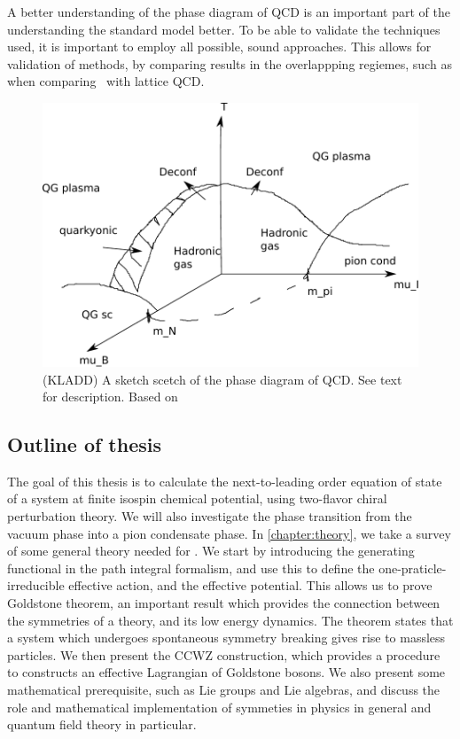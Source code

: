 A better understanding of the phase diagram of QCD is an important part of the understanding the standard model better.
To be able to validate the techniques used, it is important to employ all possible, sound approaches.
This allows for validation of methods, by comparing results in the overlappping regiemes, such as when comparing \chpt\ with lattice QCD.

\begin{figure}
    \centering
    \includegraphics[]{figurer/phase_diagram.pdf}
    \caption{(KLADD) A sketch scetch of the phase diagram of QCD. See text for description. Based on~\cite{from_hadrons_to_quarks,
    Brandt:QCD_phase_diagram_with_isospin_chemical_potential,Brandt:QCD_phase_diagram_for_nonzero_isospin-asymmetry,Fukushima:The_phase_diagram_of_dense_QCD,mannarelli:meson_condensation}
    }
    \label{fig:phase diag qcd}
\end{figure}

\subsection*{Outline of thesis}
The goal of this thesis is to calculate the next-to-leading order equation of state of a system at finite isospin chemical potential, using two-flavor chiral perturbation theory.
We will also investigate the phase transition from the vacuum phase into a pion condensate phase.
In \autoref{chapter:theory}, we take a survey of some general theory needed for \chpt.
We start by introducing the generating functional in the path integral formalism, and use this to define the one-praticle-irreducible effective action, and the effective potential.
This allows us to prove Goldstone theorem, an important result which provides the connection between the symmetries of a theory, and its low energy dynamics.
The theorem states that a system which undergoes spontaneous symmetry breaking gives rise to massless particles.
We then present the CCWZ construction, which provides a procedure to constructs an effective Lagrangian of Goldstone bosons.
We also present some mathematical prerequisite, such as Lie groups and Lie algebras, and discuss the role and mathematical implementation of symmeties in physics in general and quantum field theory in particular.

